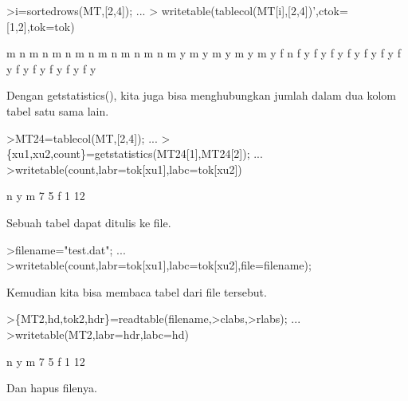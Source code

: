 \documentclass[a4paper,10pt]{article}
\begin{document}
\begin{eulernotebook}
\begin{eulercomment}
\begin{eulercomment}
\begin{eulerprompt}
>i=sortedrows(MT,[2,4]);  ...
>  writetable(tablecol(MT[i],[2,4])',ctok=[1,2],tok=tok)
\end{eulerprompt}
\begin{euleroutput}
           m         n
           m         n
           m         n
           m         n
           m         n
           m         n
           m         n
           m         y
           m         y
           m         y
           m         y
           m         y
           f         n
           f         y
           f         y
           f         y
           f         y
           f         y
           f         y
           f         y
           f         y
           f         y
           f         y
           f         y
           f         y
\end{euleroutput}
\begin{eulercomment}
Dengan getstatistics(), kita juga bisa menghubungkan jumlah dalam dua
kolom tabel satu sama lain.
\end{eulercomment}
\begin{eulerprompt}
>MT24=tablecol(MT,[2,4]); ...
>\{xu1,xu2,count\}=getstatistics(MT24[1],MT24[2]); ...
>writetable(count,labr=tok[xu1],labc=tok[xu2])
\end{eulerprompt}
\begin{euleroutput}
                     n         y
           m         7         5
           f         1        12
\end{euleroutput}
\begin{eulercomment}
Sebuah tabel dapat ditulis ke file.
\end{eulercomment}
\begin{eulerprompt}
>filename="test.dat"; ...
>writetable(count,labr=tok[xu1],labc=tok[xu2],file=filename);
\end{eulerprompt}
\begin{eulercomment}
Kemudian kita bisa membaca tabel dari file tersebut.
\end{eulercomment}
\begin{eulerprompt}
>\{MT2,hd,tok2,hdr\}=readtable(filename,>clabs,>rlabs); ...
>writetable(MT2,labr=hdr,labc=hd)
\end{eulerprompt}
\begin{euleroutput}
                     n         y
           m         7         5
           f         1        12
\end{euleroutput}
\begin{eulercomment}
Dan hapus filenya.
\end{eulercomment}

\end{eulercomment}
\end{eulercomment}
\end{eulernotebook}
\end{document}
